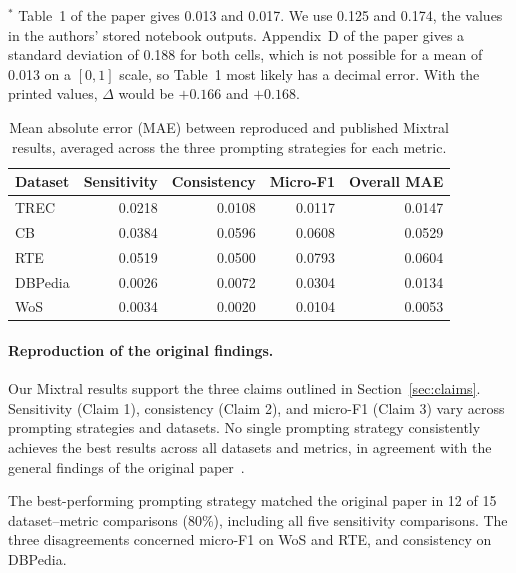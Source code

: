 \begin{table}[H]
\vspace{2pt}
\raggedright\footnotesize
$^{\ast}$ Table~1 of the paper gives 0.013 and 0.017. We use 0.125 and 0.174,
the values in the authors' stored notebook outputs. Appendix~D of the paper
gives a standard deviation of 0.188 for both cells, which is not possible for a
mean of 0.013 on a $[0,1]$ scale, so Table~1 most likely has a decimal error.
With the printed values, $\Delta$ would be $+0.166$ and $+0.168$.
\end{table}

\begin{table}[H]
\centering
\caption{Mean absolute error (MAE) between reproduced
and published Mixtral results, averaged across
the three prompting strategies for each metric.}
\label{tab:mixtral-mae}
\small
\begin{tabular}{lrrrr}
\toprule
Dataset & Sensitivity & Consistency & Micro-F1 & Overall MAE \\
\midrule
TREC    & 0.0218 & 0.0108 & 0.0117 & 0.0147 \\
CB      & 0.0384 & 0.0596 & 0.0608 & 0.0529 \\
RTE     & 0.0519 & 0.0500 & 0.0793 & 0.0604 \\
DBPedia & 0.0026 & 0.0072 & 0.0304 & 0.0134 \\
WoS     & 0.0034 & 0.0020 & 0.0104 & 0.0053 \\
\bottomrule
\end{tabular}
\end{table}

\paragraph{Reproduction of the original findings.}
\mbox{}\par

Our Mixtral results support the three claims
outlined in Section~\ref{sec:claims}.
Sensitivity (Claim 1), consistency (Claim 2),
and micro-F1 (Claim 3) vary across prompting
strategies and datasets. No single prompting
strategy consistently achieves the best results
across all datasets and metrics, in agreement
with the general findings of the original
paper~\cite{Errica:2025}.

\par\medskip

The best-performing prompting strategy matched
the original paper in 12 of 15 dataset--metric
comparisons (80\%), including all five
sensitivity comparisons. The three disagreements
concerned micro-F1 on WoS and RTE, and
consistency on DBPedia.

